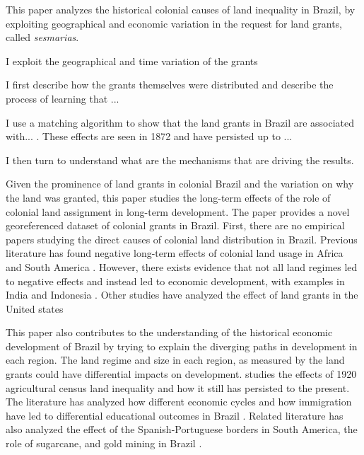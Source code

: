 \documentclass{article}
\begin{document}
This paper analyzes the historical colonial causes of land inequality in Brazil, by exploiting geographical and economic variation in the request for land grants, called \textit{sesmarias}.

I exploit the geographical and time variation of the grants 

I first describe how the grants themselves were distributed and describe the process of learning that ...

I use a matching algorithm to show that the land grants in Brazil are associated with... . These effects are seen in 1872 and have persisted up to ... 

I then turn to understand what are the mechanisms that are driving the results. 

Given the prominence of land grants in colonial Brazil and the variation on why the land was granted, this paper studies the long-term effects of the role of colonial land assignment in long-term development.  
The paper provides a novel georeferenced dataset of colonial grants in Brazil. 
First, there are no empirical papers studying the direct causes of colonial land distribution in Brazil. 
Previous literature has found negative long-term effects of colonial land usage in Africa and South America \parencites{Dell2010-qt}{Lowes2021-ww}. 
However, there exists evidence that not all land regimes led to negative effects and instead led to economic development, with examples in India and Indonesia \parencites{Banerjee2005-ki}{Dell2019-np}{Ratnoo2023-vw}.  
Other studies have analyzed the effect of land grants in the United states \parencites{Akee2014-uw}{Allen2019-kh}{Smith2023-ip}

This paper also contributes to the understanding of the historical economic development of Brazil by trying to explain the diverging paths in development in each region. 
The land regime and size in each region, as measured by the land grants could have differential impacts on development.
\textcite{Wigton-Jones2020-ex} studies the effects of 1920 agricultural census land inequality and how it still has persisted to the present.
The literature has analyzed how different economic cycles and how immigration have led to differential educational outcomes in Brazil \parencites{Musacchio2014-pq}{Rocha2017-yq}.
Related literature has also analyzed the effect of the Spanish-Portuguese borders in South America, the role of sugarcane, and gold mining in Brazil \parencites{Laudares2022-vy}{Naritomi2012-or}.

\parencite{Dell2010-qt}
\parencite{Sokoloff2000-mb}
\end{document}
